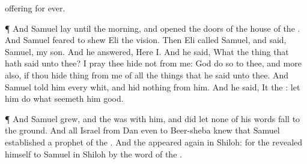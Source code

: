 {offering
for
ever.
\par }{\PP {}¶ And
Samuel
lay until the
morning, and
opened the
doors of the
house of the
{}. And
Samuel
feared to
shew
Eli the
vision.
Then
Eli
called
Samuel, and
said,
Samuel, my
son. And he
answered, Here
{} I.
And he
said, What
{} the
thing that
{} hath
said unto thee? I pray thee
hide
{} not from me:
God do
so to thee, and more
also, if thou
hide
{}
thing from me of all the
things that he
said unto thee.
And
Samuel
told him every
whit, and
hid nothing from him. And he
said, It
{} the
{}: let him
do what
seemeth him
good.
\par }{\PP {}¶ And
Samuel
grew, and the
{} was with him, and did let none of his
words
fall to the
ground.
And all
Israel from
Dan even to
Beer-sheba
knew that
Samuel
{}
established
{} a
prophet of the
{}.
And the
{}
appeared
again in
Shiloh: for the
{}
revealed himself to
Samuel in
Shiloh by the
word of the
{}.

}
